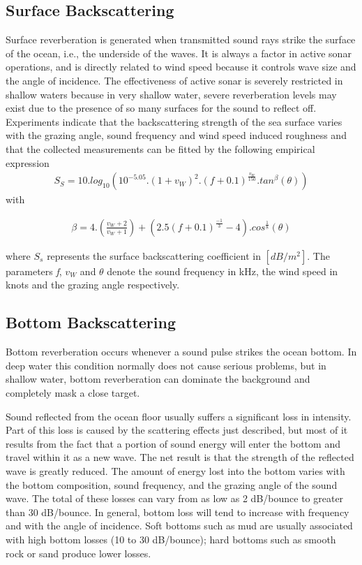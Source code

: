 \subsection{ Surface Backscattering } \label{ Surface Backscattering } 
\noindent Surface reverberation is generated when transmitted sound rays strike the surface of the ocean, i.e., the underside of the waves. It is always a factor in active sonar operations, and is directly related to wind speed because it controls wave size and the angle of incidence. The effectiveness of active sonar is severely restricted in shallow waters because in very shallow water, severe reverberation levels may exist due to the presence of so many surfaces for the sound to reflect off. Experiments indicate that the backscattering strength of the sea surface varies with the grazing angle, sound frequency and wind speed induced roughness and that the collected measurements can be fitted by the following empirical expression
\begin{align}
{S_S}  = 10 . log_{10}( 10^{-5.05}  . ( 1 + {v_W} )^2 . ( \textit{f} + 0.1 )^{\frac{v_W}{150}} . tan^{\beta}(\theta))
\end{align}
\noindent with

\begin{align}
\beta  = 4 . (\frac{v_W + 2}{v_W+ 1}) + ( 2.5 ( f + 0.1 )^{\frac{-1}{3}} - 4 ) . cos^{\frac{1}{8}}(\theta)
\end{align}
 
\noindent where $ {S_s} $ represents the surface backscattering coefficient in $ [dB/m^2] $. The parameters \textit{f}, ${v_W}$  and  $\theta$ denote the sound frequency in kHz, the wind speed in knots and the grazing angle respectively. 

\subsection{ Bottom Backscattering } \label{ Bottom Backscattering } 
\noindent Bottom reverberation occurs whenever a sound pulse strikes the ocean bottom. In deep water this condition normally does not cause serious problems, but in shallow water, bottom reverberation can dominate the background and completely mask a close target. 

\noindent Sound reflected from the ocean floor usually suffers a significant loss in intensity. Part of this loss is caused by the scattering effects just described, but most of it results from the fact that a portion of sound energy will enter the bottom and travel within it as a new wave. The net result is that the strength of the reflected wave is greatly reduced. The amount of energy lost into the bottom varies with the bottom composition, sound frequency, and the grazing angle of the sound wave. The total of these losses can vary from as low as 2 dB/bounce to greater than 30 dB/bounce. In general, bottom loss will tend to increase with frequency and with the angle of incidence. Soft bottoms such as mud are usually associated with high bottom losses (10 to 30 dB/bounce); hard bottoms such as smooth rock or sand produce lower losses.

